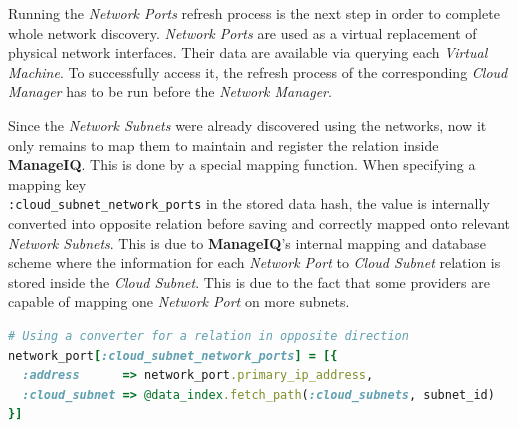 Running the \emph{Network Ports} refresh process is the next step in order to complete whole network discovery. \emph{Network Ports} are used as a virtual replacement of physical network interfaces. Their data are available via querying each \emph{Virtual Machine}. To successfully access it, the refresh process of the corresponding \emph{Cloud Manager} has to be run before the \emph{Network Manager}.

Since the \emph{Network Subnets} were already discovered using the networks, now it only remains to map them to maintain and register the relation inside \textbf{ManageIQ}. This is done by a special mapping function. When specifying a mapping key \\ \verb|:cloud_subnet_network_ports| in the stored data hash, the value is internally converted into opposite relation before saving and correctly mapped onto relevant \emph{Network Subnets}. This is due to \textbf{ManageIQ}'s internal mapping and database scheme where the information for each \emph{Network Port} to \emph{Cloud Subnet} relation is stored inside the \emph{Cloud Subnet}. This is due to the fact that some providers are capable of mapping one \emph{Network Port} on more subnets.

\begin{lstlisting}[language=Ruby,caption={\emph{Network port} to \emph{Cloud subnet} mapping},label=code:port_to_subnet]
# Using a converter for a relation in opposite direction
network_port[:cloud_subnet_network_ports] = [{
  :address      => network_port.primary_ip_address,
  :cloud_subnet => @data_index.fetch_path(:cloud_subnets, subnet_id)
}]
\end{lstlisting}

